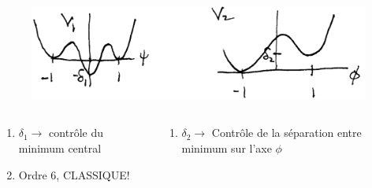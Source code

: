 \documentclass[handout]{beamer}
\begin{document}
\begin{frame}

\begin{figure}[0.3\textwidth]
    \includegraphics[scale=0.25]{psi_phi.png}
    \end{figure}
\begin{columns}[T]
    \begin{column}[T]{.5\linewidth}
    \begin{enumerate}
    \item $\delta_1 \rightarrow$ contrôle du minimum central
    \item Ordre 6, CLASSIQUE! 
    \end{enumerate}
   
    \end{column}
    \begin{column}[T]{.5\linewidth}
    \begin{enumerate}
    \item $\delta_2 \rightarrow$ Contrôle de la séparation entre minimum sur l'axe $\phi$
    \end{enumerate}

    \end{column}
  \end{columns}

\end{frame}
\end{document}
